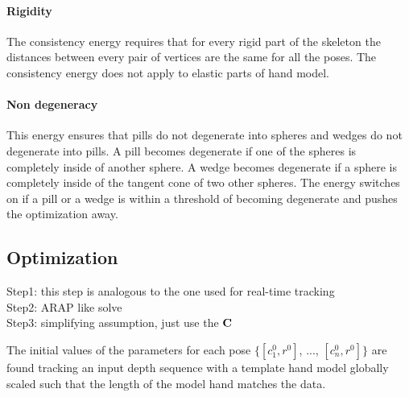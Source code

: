 \paragraph{Rigidity}
The consistency energy requires that for every rigid part of the skeleton the distances between every pair of vertices are the same for all the poses. The consistency energy does not apply to elastic parts of hand model.

\paragraph{Non degeneracy}
This energy ensures that pills do not degenerate into spheres and wedges do not degenerate into pills.
A pill becomes degenerate if one of the spheres is completely inside of another sphere. A wedge becomes degenerate if a sphere is completely inside of the tangent cone of two other spheres. The energy switches on if a pill or a wedge is within a threshold of becoming degenerate and pushes the optimization away.


\subsection{Optimization}
Step1: this step is analogous to the one used for real-time tracking\\
Step2: ARAP like solve\\
Step3: simplifying assumption, just use the $\mathbf{C}$

\begin{DRAFT}
The initial values of the parameters for each pose  $\{[c^0_1 , r^0]$, ..., $[c^0_n, r^0]\}$ are found tracking an input depth sequence with a template hand model globally scaled such that the length of the model hand matches the data.
\end{DRAFT}

